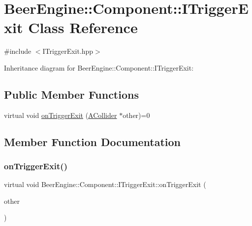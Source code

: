\hypertarget{class_beer_engine_1_1_component_1_1_i_trigger_exit}{}\section{Beer\+Engine\+:\+:Component\+:\+:I\+Trigger\+Exit Class Reference}
\label{class_beer_engine_1_1_component_1_1_i_trigger_exit}


{\ttfamily \#include $<$I\+Trigger\+Exit.\+hpp$>$}



Inheritance diagram for Beer\+Engine\+:\+:Component\+:\+:I\+Trigger\+Exit\+:
\subsection*{Public Member Functions}
\begin{DoxyCompactItemize}
\item 
virtual void \mbox{\hyperlink{class_beer_engine_1_1_component_1_1_i_trigger_exit_ad5bc744f738cb2c52de40b243954967f}{on\+Trigger\+Exit}} (\mbox{\hyperlink{class_beer_engine_1_1_component_1_1_a_collider}{A\+Collider}} $\ast$other)=0
\end{DoxyCompactItemize}


\subsection{Member Function Documentation}
\mbox{\label{class_beer_engine_1_1_component_1_1_i_trigger_exit_ad5bc744f738cb2c52de40b243954967f}} 
\subsubsection{\texorpdfstring{on\+Trigger\+Exit()}{onTriggerExit()}}
{\footnotesize\ttfamily virtual void Beer\+Engine\+::\+Component\+::\+I\+Trigger\+Exit\+::on\+Trigger\+Exit (\begin{DoxyParamCaption}\item[{\mbox{\hyperlink{class_beer_engine_1_1_component_1_1_a_collider}{A\+Collider}} $\ast$}]{other }\end{DoxyParamCaption})\hspace{0.3cm}{\ttfamily [pure virtual]}}



